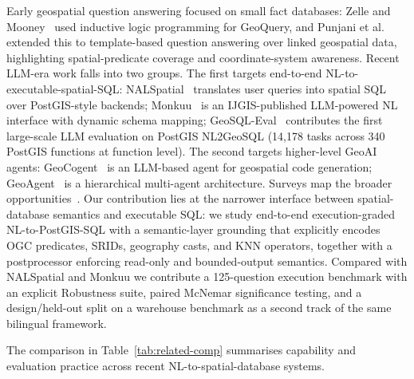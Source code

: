 \documentclass[11pt]{article}
\begin{document}
Early geospatial question answering focused on small fact databases: Zelle and Mooney~\cite{zelle1996geoquery} used inductive logic programming for GeoQuery, and Punjani et al.~\cite{punjani2018geospatial} extended this to template-based question answering over linked geospatial data, highlighting spatial-predicate coverage and coordinate-system awareness. Recent LLM-era work falls into two groups. The first targets end-to-end NL-to-executable-spatial-SQL: NALSpatial~\cite{liu2025nalspatial} translates user queries into spatial SQL over PostGIS-style backends; Monkuu~\cite{yu2025monkuu} is an IJGIS-published LLM-powered NL interface with dynamic schema mapping; GeoSQL-Eval~\cite{hou2026geosql} contributes the first large-scale LLM evaluation on PostGIS NL2GeoSQL (14{,}178 tasks across 340 PostGIS functions at function level). The second targets higher-level GeoAI agents: GeoCogent~\cite{houcoding2025} is an LLM-based agent for geospatial code generation; GeoAgent~\cite{lin2026geoagent} is a hierarchical multi-agent architecture. Surveys map the broader opportunities~\cite{mai2024foundation}. Our contribution lies at the narrower interface between spatial-database semantics and executable SQL: we study end-to-end execution-graded NL-to-PostGIS-SQL with a semantic-layer grounding that explicitly encodes OGC predicates, SRIDs, geography casts, and KNN operators, together with a postprocessor enforcing read-only and bounded-output semantics. Compared with NALSpatial and Monkuu we contribute a 125-question execution benchmark with an explicit Robustness suite, paired McNemar significance testing, and a design/held-out split on a warehouse benchmark as a second track of the same bilingual framework.

The comparison in Table~\ref{tab:related-comp} summarises capability and
evaluation practice across recent NL-to-spatial-database systems.
\end{document}
